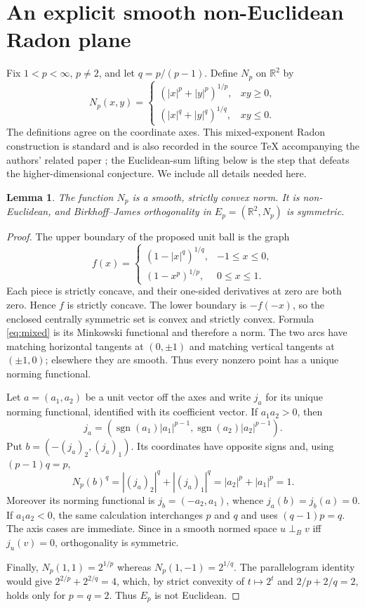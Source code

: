 \documentclass[11pt]{article}
\newtheorem{lemma}[theorem]{Lemma}
\newcommand{\R}{\mathbb R}
\newcommand{\BJ}{\mathrel{\perp_{\!B}}}
\begin{document}
\section{An explicit smooth non-Euclidean Radon plane}

Fix $1<p<\infty$, $p\ne2$, and let $q=p/(p-1)$.  Define $N_p$ on $\R^2$ by
\begin{equation}\label{eq:mixed}
 N_p(x,y)=
 \begin{cases}
 (|x|^p+|y|^p)^{1/p},&xy\ge0,\\
 (|x|^q+|y|^q)^{1/q},&xy\le0.
 \end{cases}
\end{equation}
The definitions agree on the coordinate axes.
This mixed-exponent Radon construction is standard and is also recorded in
the source TeX accompanying the authors' related paper \cite{SPJ}; the
Euclidean-sum lifting below is the step that defeats the higher-dimensional
conjecture.  We include all details needed here.

\begin{lemma}\label{lem:radon}
The function $N_p$ is a smooth, strictly convex norm.  It is non-Euclidean,
and Birkhoff--James orthogonality in $E_p=(\R^2,N_p)$ is symmetric.
\end{lemma}

\begin{proof}
The upper boundary of the proposed unit ball is the graph
\[
 f(x)=
 \begin{cases}
 (1-|x|^q)^{1/q},&-1\le x\le0,\\
 (1-x^p)^{1/p},&0\le x\le1.
 \end{cases}
\]
Each piece is strictly concave, and their one-sided derivatives at zero are
both zero.  Hence $f$ is strictly concave.  The lower boundary is
$-f(-x)$, so the enclosed centrally symmetric set is convex and strictly
convex.  Formula \eqref{eq:mixed} is its Minkowski functional and therefore
a norm.  The two arcs have matching horizontal tangents at $(0,\pm1)$ and
matching vertical tangents at $(\pm1,0)$; elsewhere they are smooth.  Thus
every nonzero point has a unique norming functional.

Let $a=(a_1,a_2)$ be a unit vector off the axes and write $j_a$ for its
unique norming functional, identified with its coefficient vector.  If
$a_1a_2>0$, then
\[
 j_a=(\operatorname{sgn}(a_1)|a_1|^{p-1},
      \operatorname{sgn}(a_2)|a_2|^{p-1}).
\]
Put $b=(-(j_a)_2,(j_a)_1)$.  Its coordinates have opposite signs and,
using $(p-1)q=p$,
\[
 N_p(b)^q=|(j_a)_2|^q+|(j_a)_1|^q
          =|a_2|^p+|a_1|^p=1.
\]
Moreover its norming functional is $j_b=(-a_2,a_1)$, whence
$j_a(b)=j_b(a)=0$.  If $a_1a_2<0$, the same calculation interchanges $p$
and $q$ and uses $(q-1)p=q$.  The axis cases are immediate.  Since in a
smooth normed space $u\BJ v$ iff $j_u(v)=0$, orthogonality is symmetric.

Finally, $N_p(1,1)=2^{1/p}$ whereas $N_p(1,-1)=2^{1/q}$.  The parallelogram
identity would give
$2^{2/p}+2^{2/q}=4$, which, by strict convexity of
$t\mapsto2^t$ and $2/p+2/q=2$, holds only for $p=q=2$.
Thus $E_p$ is not Euclidean.
\end{proof}
\end{document}
